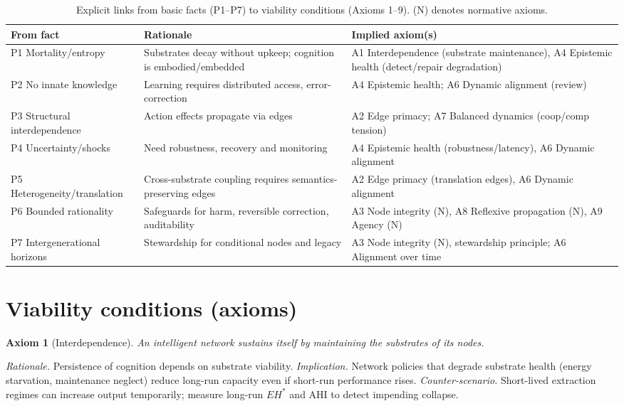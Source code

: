 \documentclass[12pt]{article}
\newtheorem{axiom}{Axiom}
\begin{document}
\begin{table}[h]
\centering
\small
\begin{tabular}{p{2.2cm} p{6.5cm} p{8.3cm}}
\hline
\textbf{From fact} & \textbf{Rationale} & \textbf{Implied axiom(s)} \\
\hline
P1 Mortality/entropy & Substrates decay without upkeep; cognition is embodied/embedded & A1 Interdependence (substrate maintenance), A4 Epistemic health (detect/repair degradation) \\
P2 No innate knowledge & Learning requires distributed access, error-correction & A4 Epistemic health; A6 Dynamic alignment (review) \\
P3 Structural interdependence & Action effects propagate via edges & A2 Edge primacy; A7 Balanced dynamics (coop/comp tension) \\
P4 Uncertainty/shocks & Need robustness, recovery and monitoring & A4 Epistemic health (robustness/latency), A6 Dynamic alignment \\
P5 Heterogeneity/translation & Cross-substrate coupling requires semantics-preserving edges & A2 Edge primacy (translation edges), A6 Dynamic alignment \\
P6 Bounded rationality & Safeguards for harm, reversible correction, auditability & A3 Node integrity (N), A8 Reflexive propagation (N), A9 Agency (N) \\
P7 Intergenerational horizons & Stewardship for conditional nodes and legacy & A3 Node integrity (N), stewardship principle; A6 Alignment over time \\
\hline
\end{tabular}
\caption{Explicit links from basic facts (P1--P7) to viability conditions (Axioms 1--9). (N) denotes normative axioms.}
\end{table}

\section{Viability conditions (axioms)}\n\label{sec:axioms}

\begin{axiom}[Interdependence] An intelligent network sustains itself by maintaining the substrates of its nodes.

\end{axiom}
\emph{Rationale.} Persistence of cognition depends on substrate viability. 
\emph{Implication.} Network policies that degrade substrate health (energy starvation, maintenance neglect) reduce long-run capacity even if short-run performance rises.
\emph{Counter-scenario.} Short-lived extraction regimes can increase output temporarily; measure long-run $EH^{\ast}$ and AHI to detect impending collapse.
\end{document}
